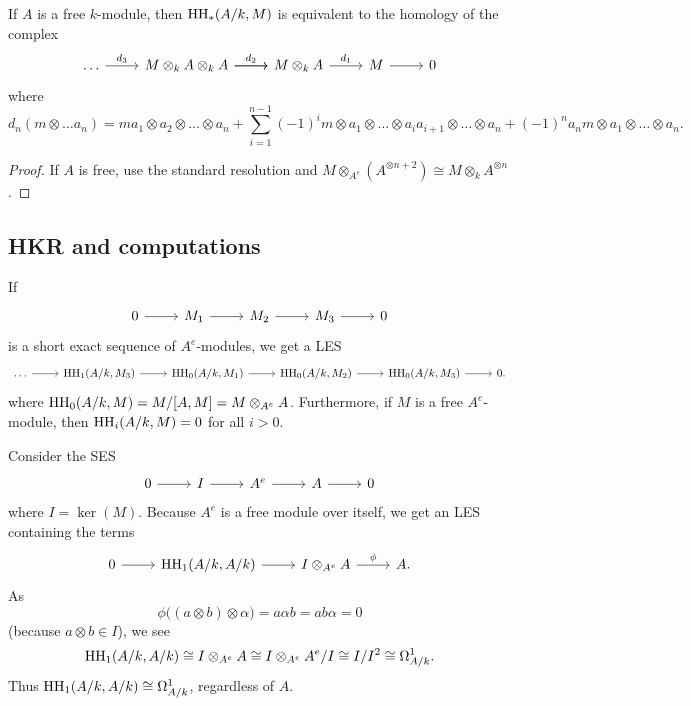 \documentclass{amsart}
\begin{document}
\begin{thm}
	If $A$ is a free $k$-module, then $\mathrm{HH}_*(A/k, M)$ is equivalent to the homology of the complex
	\[
		\begin{tikzcd}
			\dots \rar["d_3"] & M \otimes_k A \otimes_k A \rar["d_2"] \rar & M \otimes_k A \rar["d_1"] & M \rar & 0
		\end{tikzcd}
	\]
	where
	\[
		d_n(m \otimes \dots a_n) = m a_1 \otimes a_2 \otimes \dots \otimes a_n + \sum_{i=1}^{n-1} (-1)^i m \otimes a_1 \otimes \dots \otimes a_i a_{i+1} \otimes \dots \otimes a_n + (-1)^n a_n m \otimes a_1 \otimes \dots \otimes a_n.
	\]
\end{thm}

\begin{proof}
	If $A$ is free, use the standard resolution and $M \otimes_{A^e} (A^{\otimes n+2}) \cong M \otimes_k A^{\otimes n}$.
\end{proof}

\subsection{HKR and computations}

\begin{thm}
	If 
	\[
		\SES{M_1}{M_2}{M_3}
	\]
	is a short exact sequence of $A^e$-modules, we get a LES
	\[
		\begin{tikzcd}
			\dots \rar & \HHrm_1(A/k, M_3) \rar & \HHrm_0(A/k, M_1) \rar & \HHrm_0(A/k, M_2) \rar & \HHrm_0(A/k, M_3) \rar & 0.
		\end{tikzcd}
	\]
	where $\mathrm{HH}_0(A/k, M) = M / [A, M] = M \otimes_{A^e} A$.
	Furthermore, if $M$ is a free $A^e$-module, then $\mathrm{HH}_i(A/k, M) = 0$ for all $i > 0$.
\end{thm}

\begin{ex}
	Consider the SES
	\[
		\SES{I}{A^e}{A}
	\]
	where $I = \ker(M)$.
	Because $A^e$ is a free module over itself, we get an LES containing the terms
	\[
		\begin{tikzcd}
			0 \rar & \HHrm_1(A / k, A / k) \rar & I \otimes_{A^e} A \rar["\phi"] & A.
		\end{tikzcd}
	\]
	As 
	\[
		\phi\big((a \otimes b) \otimes \alpha\big) = a \alpha b = a b \alpha = 0
	\]
	(because $a \otimes b \in I$), we see
	\[
		\mathrm{HH}_1(A / k, A / k) \cong I \otimes_{A^e} A \cong I \otimes_{A^e} A^e / I \cong I / I^2 \cong \Omega^1_{A/k}.
	\]
	Thus $\mathrm{HH}_1(A / k, A / k) \cong \Omega^1_{A/k}$, regardless of $A$.
\end{ex}
\end{document}
